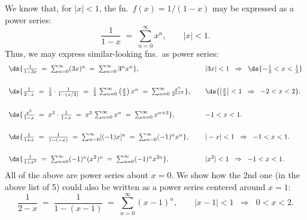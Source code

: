 \documentclass[12pt,fleqn]{article}
\begin{document}
\vs{0.1in}
\ni
We know that, for $|x| < 1$, the fn.~$f(x) = 1/(1-x)$ may be
expressed as a power series:
$$ \frac{1}{1-x} \;=\; \sum_{n=0}^\infty x^n, \qquad |x| < 1. $$
Thus, we may express similar-looking fns.~as power series:
$$ \begin{array}{ll}
	\ds{\frac{1}{1 - 3x} \;=\; \sum_{n=0}^\infty (3x)^n
	  \;=\; \sum_{n=0}^\infty 3^n x^n}, & |3x| < 1 \;\;\Rightarrow\;\;
	  \ds{-\frac{1}{3} < x < \frac{1}{3}} \\[20pt]
	\ds{\frac{1}{2-x} \;=\; \frac{1}{2}\cdot\frac{1}{1-(x/2)}
	  \;=\; \frac{1}{2}\,\sum_{n=0}^\infty \left(\frac{x}{2}\right)x^n
	  \;=\; \sum_{n=0}^\infty \frac{x^n}{2^{n+1}}}, \quad\mbox{} &
	  \ds{\left|\frac{x}{2}\right| < 1 \;\;\Rightarrow\;\; -2 < x < 2}. \\[20pt]
	\ds{\frac{x^3}{1-x} \;=\; x^3\cdot\frac{1}{1-x}
	  \;=\; x^3\,\sum_{n=0}^\infty x^n
	  \;=\; \sum_{n=0}^\infty x^{n+3}}, & -1 < x < 1. \\[20pt]
	\ds{\frac{1}{1+x} \;=\; \frac{1}{1-(-x)} \;=\; \sum_{n=0}^\infty [(-1)x]^n
	  \;=\; \sum_{n=0}^\infty (-1)^n x^n}, & |-x| < 1 \;\;\Rightarrow\;\;
	  -1 < x < 1. \\[20pt]
	\ds{\frac{1}{1+x^2} \;=\; \sum_{n=0}^\infty (-1)^n (x^2)^n
	  \;=\; \sum_{n=0}^\infty (-1)^n x^{2n}}, & |x^2| < 1 \;\;\Rightarrow\;\;
	  -1 < x < 1.
  \end{array} $$
All of the above are power series about $x=0$.  We show how the
2nd one (in the above list of 5) could also be written as a power
series centered around $x=1$:
$$ \frac{1}{2-x} \;=\; \frac{1}{1 - (x-1)}
	\;=\; \sum_{n=0}^\infty (x-1)^n, \qquad |x - 1| < 1 \;\;\Rightarrow\;\;
	0 < x < 2. $$
\end{document}
